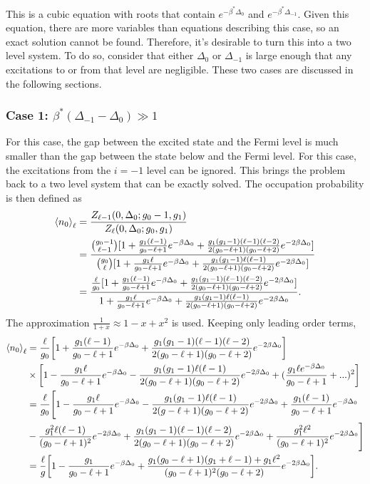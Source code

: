 This is a cubic equation with roots that contain $e^{-\beta^*\Delta_0}$ and $e^{-\beta^*\Delta_{-1}}$. 
Given this equation, there are more variables than equations describing this case, so an exact solution cannot be found. Therefore, it's desirable to turn this into a two level system. To do so, consider that either $\Delta_0$ or $\Delta_{-1}$ is large enough that any excitations to or from that level are negligible. These two cases are discussed in the following sections. 

\subsubsection{Case 1: $\beta^*(\Delta_{-1}-\Delta_0)\gg 1$}
For this case, the gap between the excited state and the Fermi level is much smaller than the gap between the state below and the Fermi level. For this case, the excitations from the $i=-1$ level can be ignored. This brings the problem back to a two level system that can be exactly solved. The occupation probability is then defined as
\begin{align}
    \left<{n_0}\right>_\ell&=\frac{Z_{\ell-1}(0,\Delta_0;g_0-1,g_1)}{Z_\ell(0,\Delta_0;g_0,g_1)}\nonumber\\
    &=\frac{{g_0-1\choose \ell-1}[1+\frac{g_1(\ell-1)}{g_0-\ell+1}e^{-\beta\Delta_0} +\frac{g_1(g_1-1)(\ell-1)(\ell-2)}{2(g_0-\ell+1)(g_0-\ell+2)}e^{-2\beta\Delta_0}]}{{g_0\choose \ell}[1+\frac{g_1 \ell}{g_0-\ell+1}e^{-\beta\Delta_0} +\frac{g_1(g_1-1)\ell(\ell-1)}{2(g_0-\ell+1)(g_0-\ell+2)}e^{-2\beta\Delta_0}]}\nonumber\\
    &=\frac{\frac{\ell}{g_0} [1+\frac{g_1(\ell-1)}{g_0-\ell+1}e^{-\beta\Delta_0} +\frac{g_1(g_1-1)(\ell-1)(\ell-2)}{2(g_0-\ell+1)(g_0-\ell+2)}e^{-2\beta\Delta_0}]}{1+\frac{g_1 \ell}{g_0-\ell+1}e^{-\beta\Delta_0} +\frac{g_1(g_1-1)\ell(\ell-1)}{2(g_0-\ell+1)(g_0-\ell+2)}e^{-2\beta\Delta_0}}.
\end{align}
The approximation $\frac{1}{1+x}\approx 1-x+x^2$ is used. Keeping only leading order terms,
\begin{align}
    \left<{n_0}\right>_\ell&=\frac{\ell}{g_0}\qty[1+\frac{g_1(\ell-1)}{g_0-\ell+1}e^{-\beta\Delta_0} +\frac{g_1(g_1-1)(\ell-1)(\ell-2)}{2(g_0-\ell+1)(g_0-\ell+2)}e^{-2\beta\Delta_0}]\nonumber\\
    &\times \qty[1-\frac{g_1\ell}{g_0-\ell+1}e^{-\beta\Delta_0}-\frac{g_1(g_1-1)\ell(\ell-1)}{2(g_0-\ell+1)(g_0-\ell+2)}e^{-2\beta\Delta_0}+(\frac{g_1 \ell e^{-\beta\Delta_0}}{g_0-\ell+1}+...)^2] \nonumber\\
    &=\frac{\ell}{g_0}\Biggr[1-\frac{g_1\ell}{g_0-\ell+1}e^{-\beta\Delta_0}-\frac{g_1(g_1-1)\ell(\ell-1)}{2(g-\ell+1)(g_0-\ell+2)}e^{-2\beta\Delta_0}+\frac{g_1(\ell-1)}{g_0-\ell+1}e^{-\beta\Delta_0}\nonumber\\
    &-\frac{g_1^2 \ell(\ell-1)}{(g_0-\ell+1)^2}e^{-2\beta\Delta_0}+\frac{g_1(g_1-1)(\ell-1)(\ell-2)}{2(g_0-\ell+1)(g_0-\ell+2)}e^{-2\beta\Delta_0}+\frac{g_1^2\ell^2}{(g_0-\ell+1)^2}e^{-2\beta\Delta_0}\Biggr]\nonumber\\
    &=\frac{\ell}{g}\qty[1-\frac{g_1}{g_0-\ell+1}e^{-\beta\Delta_0}+\frac{g_1(g_0-\ell+1)(g_1+\ell-1)+g_1\ell^2}{(g_0-\ell+1)^2(g_0-\ell+2)}e^{-2\beta\Delta_0}].
\end{align}          
